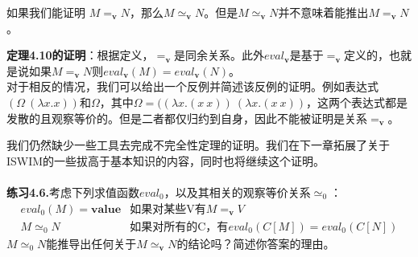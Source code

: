 \documentclass{book}
\def\v{\mathbf{v}}
\def\lianxi{\noindent \makebox[0pt][r]{$\rhd$} \textbf}
\begin{document}
\begin{Theorem}
 如果我们能证明 $M=_\v N$，那么$M\simeq_\v N$。但是$M\simeq_\v N$并不意味着能推出$M=_\v N$。
\end{Theorem}
\begin{adjustwidth}{20pt}{20pt}
 \textbf{定理4.10的证明}：根据定义，$=_\v$是同余关系。此外$eval_\v$是基于$=_\v$定义的，也就是说如果$M=_\v N$则$eval_\v(M) = eval_\v(N)$。\\
 对于相反的情况，我们可以给出一个反例并简述该反例的证明。例如表达式$(\Omega\ (\lambda x.x))$和$\Omega$，其中$\Omega=((\lambda x.(x\ x))\ (\lambda x.(x\ x))$，这两个表达式都是发散的且观察等价的。但是二者都仅归约到自身，因此不能被证明是关系$=_\v$。
\end{adjustwidth}
我们仍然缺少一些工具去完成不完全性定理的证明。我们在下一章拓展了关于ISWIM的一些拔高于基本知识的内容，同时也将继续这个证明。\\\\
\lianxi{练习4.6.}考虑下列求值函数$eval_0$，以及其相关的观察等价关系$\simeq_0$：
$$
\begin{array}{ll}
 eval_0(M)=\mathbf{value} & \text{如果对某些V有}M=_\v V\\
 M \simeq_0 N & \text{如果对所有的C，有}eval_0(C[M])=eval_0(C[N])
\end{array}
$$
$M\simeq_0 N$能推导出任何关于$M\simeq_\v N$的结论吗？简述你答案的理由。
\end{document}
